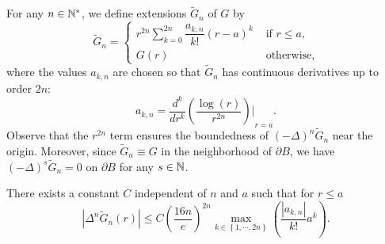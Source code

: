 \documentclass[smallextended]{svjour3}
\begin{document}
For any $n \in \mathbb{N}^{*}$, we define extensions $\tilde{G}_n$ of $G$ by
\begin{equation}
	\tilde{G}_n = \begin{cases}
	r^{2n}\sum_{k=0}^{2n} \dfrac{a_{k,n}}{k!}(r-a)^k &\text{ if }r \leq a, \\
	G(r) &\text{ otherwise,}
	\end{cases}
\end{equation}
where the values $a_{k,n}$ are chosen so that $\tilde{G}_n$ has continuous derivatives up to order $2n$:
\[a_{k,n} = {\dfrac{d^k}{dr^k}\left(\dfrac{\log(r)}{r^{2n}}\right)\bigg|}_{r=a}.\]
Observe that the $r^{2n}$ term ensures the boundedness of $(-\Delta)^n \tilde{G}_n$ near the origin. Moreover, since $\tilde{G}_n \equiv G$ in the neighborhood of $\partial B$, we have $(-\Delta)^s \tilde{G}_n = 0$ on $\partial B$ for any $s \in \mathbb{N}$.
																			
\begin{lemma} 
	\label{LemmeDegueu}
	There exists a constant $C$ independent of $n$ and $a$ such that for $r\leq a$
	\begin{equation}
		\left|\Delta^n \tilde{G}_n(r)\right| \leq  C \left( \frac{16n}{e}\right)^{2n}\!\!\!\!\!\max_{k\in \left\{1,\cdots,2n\right\}}\left(\dfrac{|a_{k,n}|}{k!}a^k\right).
		\label{bigBadEq1Reduced}
	\end{equation}
	\label{LemAkDeltanf}
\end{lemma}
																					
\end{document}
